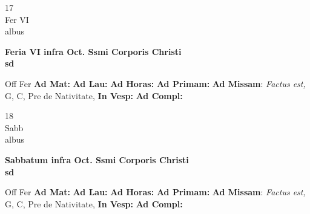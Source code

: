 \documentclass[10pt, openany]{book}
\begin{document}
    \begin{center}
        \begin{minipage}{3.5in}
            \vspace{2em}
            \begin{minipage}{0.5in}
                {\Huge 17} \\
                {\normalsize Fer VI} \\
                {\normalsize albus}
            \end{minipage}
            \begin{minipage}{3.0in}
                \textbf{ \large Feria VI infra Oct. Ssmi Corporis Christi \\
                \textnormal{\normalsize sd}} \\ 
            \end{minipage}
            \begin{justify}Off Fer
                \textbf{Ad Mat: }
                \textbf{Ad Lau: }
                \textbf{Ad Horas: }
                \textbf{Ad Primam: }\textbf{Ad Missam}: \textit{Factus est,} G, C, Pre de Nativitate,  
                \textbf{In Vesp: }
                \textbf{Ad Compl: }
            \end{justify}
        \end{minipage}
    \end{center}

    \begin{center}
        \begin{minipage}{3.5in}
            \vspace{2em}
            \begin{minipage}{0.5in}
                {\Huge 18} \\
                {\normalsize Sabb} \\
                {\normalsize albus}
            \end{minipage}
            \begin{minipage}{3.0in}
                \textbf{ \large Sabbatum infra Oct. Ssmi Corporis Christi \\
                \textnormal{\normalsize sd}} \\ 
            \end{minipage}
            \begin{justify}Off Fer
                \textbf{Ad Mat: }
                \textbf{Ad Lau: }
                \textbf{Ad Horas: }
                \textbf{Ad Primam: }\textbf{Ad Missam}: \textit{Factus est,} G, C, Pre de Nativitate,  
                \textbf{In Vesp: }
                \textbf{Ad Compl: }
            \end{justify}
        \end{minipage}
    \end{center}
\end{document}
